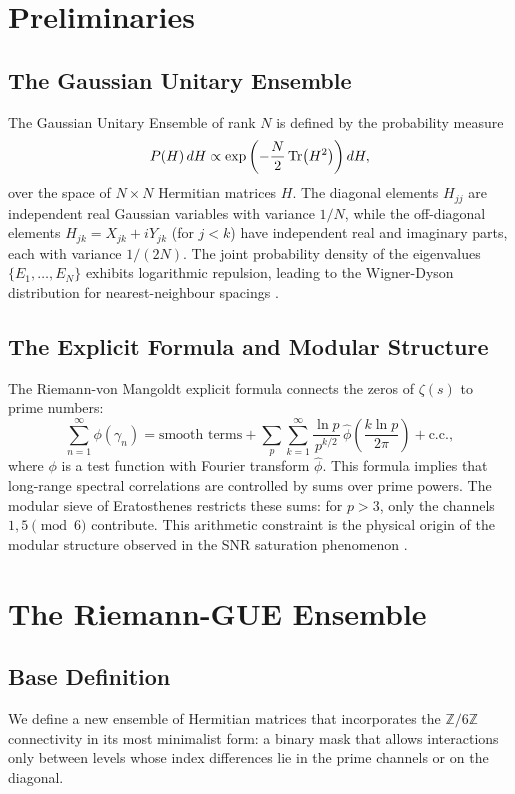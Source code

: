 \documentclass[12pt,a4paper]{article}
\theoremstyle{plain}
\theoremstyle{definition}
\theoremstyle{remark}
\begin{document}
\section{Preliminaries}
\label{sec:preliminaries}

\subsection{The Gaussian Unitary Ensemble}
The Gaussian Unitary Ensemble of rank $N$ is defined by the probability measure
\begin{equation}
P(H) \, dH \propto \exp\left(-\frac{N}{2} \Tr(H^2)\right) dH,
\label{eq:gue_measure}
\end{equation}
over the space of $N \times N$ Hermitian matrices $H$. The diagonal elements $H_{jj}$ are independent real Gaussian variables with variance $1/N$, while the off-diagonal elements $H_{jk} = X_{jk} + i Y_{jk}$ (for $j < k$) have independent real and imaginary parts, each with variance $1/(2N)$. The joint probability density of the eigenvalues $\{E_1, \dots, E_N\}$ exhibits logarithmic repulsion, leading to the Wigner-Dyson distribution for nearest-neighbour spacings \cite{mehta2004}.

\subsection{The Explicit Formula and Modular Structure}
The Riemann-von Mangoldt explicit formula connects the zeros of $\zeta(s)$ to prime numbers:
\begin{equation}
\sum_{n=1}^{\infty} \phi(\gamma_n) = \text{smooth terms} + \sum_{p} \sum_{k=1}^{\infty} \frac{\ln p}{p^{k/2}} \, \hat{\phi}\left(\frac{k \ln p}{2\pi}\right) + \text{c.c.},
\label{eq:explicit}
\end{equation}
where $\phi$ is a test function with Fourier transform $\hat{\phi}$. This formula implies that long-range spectral correlations are controlled by sums over prime powers. The modular sieve of Eratosthenes restricts these sums: for $p>3$, only the channels $1,5 \pmod{6}$ contribute. This arithmetic constraint is the physical origin of the modular structure observed in the SNR saturation phenomenon \cite{R1}.

\section{The Riemann-GUE Ensemble}
\label{sec:ensemble}

\subsection{Base Definition}
We define a new ensemble of Hermitian matrices that incorporates the $\mathbb{Z}/6\mathbb{Z}$ connectivity in its most minimalist form: a binary mask that allows interactions only between levels whose index differences lie in the prime channels or on the diagonal.
\end{document}
